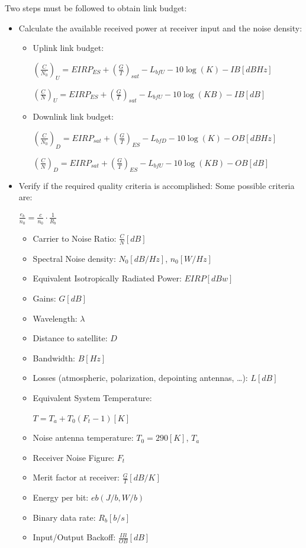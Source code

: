 \documentclass[../main.tex]{subfiles}
\begin{document}
Two steps must be followed to obtain link budget:
\begin{itemize}
	\item {
		Calculate the available received power at receiver input and the noise density:
		\begin{itemize}
			\item {
				Uplink link budget:

				$\left( \frac {C} {N_0} \right)_U = EIRP_{ES} + \left( \frac {G} {T} \right)_{sat} - L_{bfU} - 10 \log(K) - IB [dBHz]$

				$\left( \frac {C} {N} \right)_U = EIRP_{ES} + \left( \frac {G} {T} \right)_{sat} - L_{bfU} - 10 \log(KB) - IB [dB]$
			}
			\item {
				Downlink link budget:

				$\left( \frac {C} {N_0} \right)_D = EIRP_{sat} + \left( \frac {G} {T} \right)_{ES} - L_{bfD} - 10 \log(K) - OB [dBHz]$

				$\left( \frac {C} {N} \right)_D = EIRP_{sat} + \left( \frac {G} {T} \right)_{ES} - L_{bfU} - 10 \log(KB) - OB [dB]$
			}
		\end{itemize}
	}
	\item {
		Verify if the required quality criteria is accomplished:
		Some possible criteria are:

		$\frac {e_b} {n_0} = \frac {c} {n_0} \cdot \frac {1} {R_b}$

		\begin{itemize}
			\item Carrier to Noise Ratio: $\frac {C} {N} [dB]$
			\item Spectral Noise density: $N_0 [dB/Hz]$, $n_0 [W/Hz]$
			\item Equivalent Isotropically Radiated Power: $EIRP [dBw]$
			\item Gains: $G [dB]$
			\item Wavelength: $\lambda$
			\item Distance to satellite: $D$
			\item Bandwidth: $B [Hz]$
			\item Losses (atmospheric, polarization, depointing antennas, \ldots): $L [dB]$
			\item {
				Equivalent System Temperature:

				$T = T_a + T_0 (F_t - 1) [K]$
			}
			\item Noise antenna temperature: $T_0 = 290 [K]$, $T_a$
			\item Receiver Noise Figure: $F_t$
			\item Merit factor at receiver: $\frac {G} {T} [dB/K]$
			\item Energy per bit: $eb (J/b, W/b)$
			\item Binary data rate: $R_b [b/s]$
			\item Input/Output Backoff: $\frac {IB} {OB} [dB]$
		\end{itemize}
	}
\end{itemize}
\end{document}
